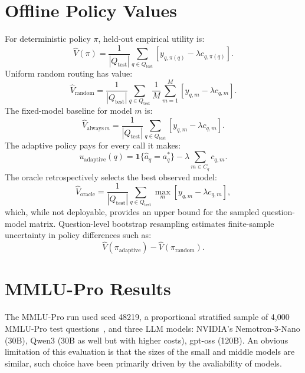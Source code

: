 \documentclass[11pt]{article}
\begin{document}
\section{Offline Policy Values}
For deterministic policy $\pi$, held-out empirical utility is:
\begin{equation*}
\widehat{V}(\pi)
=
\frac{1}{|Q_{\mathrm{test}}|}
\sum_{q\in Q_{\mathrm{test}}}
\left[y_{q,\pi(q)}-\lambda c_{q,\pi(q)}\right].
\end{equation*}
Uniform random routing has value:
\begin{equation*}
\widehat{V}_{\mathrm{random}}
=
\frac{1}{|Q_{\mathrm{test}}|}
\sum_{q\in Q_{\mathrm{test}}}
\frac{1}{M}
\sum_{m=1}^{M}
\left[y_{q,m}-\lambda c_{q,m}\right].
\end{equation*}
The fixed-model baseline for model $m$ is:
\begin{equation*}
\widehat{V}_{\mathrm{always}\,m}
=
\frac{1}{|Q_{\mathrm{test}}|}
\sum_{q\in Q_{\mathrm{test}}}
\left[y_{q,m}-\lambda c_{q,m}\right].
\end{equation*}
The adaptive policy pays for every call it makes:
\begin{equation*}
u_{\mathrm{adaptive}}(q)
=
\mathbf{1}\{\widehat{a}_q=a_q^*\}
-\lambda\sum_{m\in C_q}c_{q,m}.
\end{equation*}
The oracle retrospectively selects the best observed model:
\begin{equation*}
\widehat{V}_{\mathrm{oracle}}
=
\frac{1}{|Q_{\mathrm{test}}|}
\sum_{q\in Q_{\mathrm{test}}}
\max_m\left[y_{q,m}-\lambda c_{q,m}\right], 
\end{equation*}
which, while not deployable, provides an upper bound for the sampled question-model matrix.
Question-level bootstrap resampling estimates finite-sample uncertainty in policy differences such as:
\begin{equation*}
\widehat{V}(\pi_{\mathrm{adaptive}})
-\widehat{V}(\pi_{\mathrm{random}}).
\end{equation*}

\section{MMLU-Pro Results}

The MMLU-Pro run used seed 48219, a proportional stratified sample of 4,000 MMLU-Pro test questions~\citep{wang2024mmlupro}, and three LLM models: NVIDIA's Nemotron-3-Nano (30B), Qwen3 (30B as well but with higher costs), gpt-oss (120B).
An obvious limitation of this evaluation is that the sizes of the small and middle models are similar, such choice have been primarily driven by the avaliability of models. 
\end{document}
